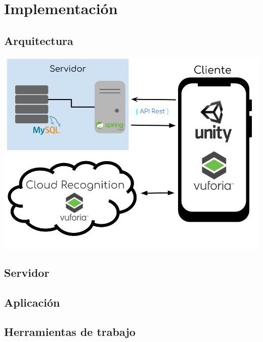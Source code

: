 
\cleardoublepage


\chapter{Implementación}
\label{makereference4}

\section{Arquitectura}
\label{makereference4.1}
\includegraphics[scale=0.47]{figures/Arquitectura.png}

\section{Servidor}
\label{makereference4.2}

\section{Aplicación}
\label{makereference4.3}

\section{Herramientas de trabajo}
\label{makereference4.3}


